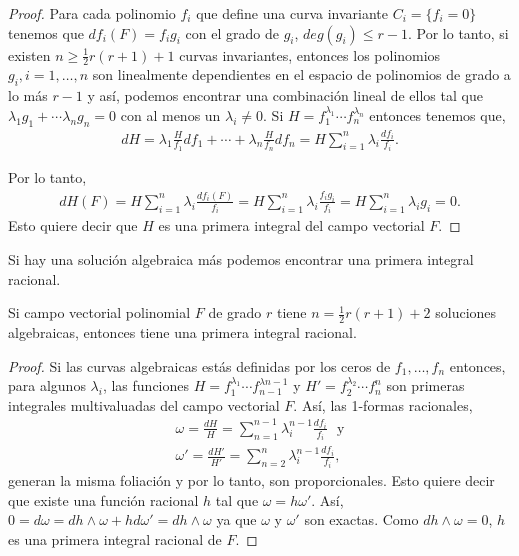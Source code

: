 \begin{proof}
Para cada polinomio $f_{i}$ que define una curva invariante $C_{i}=\{f_{i}=0\}$ tenemos que $df_{i}(F)=f_{i}g_{i}$ con el grado de $g_{i}$, $deg(g_{i})\leq r-1$. Por lo tanto, si existen $n\geq \frac{1}{2}r(r+1)+1$ curvas invariantes, entonces los polinomios $g_{i}, i=1,\ldots,n$ son linealmente dependientes en el espacio de polinomios de grado a lo más $r-1$ y así, podemos encontrar una combinación lineal de ellos tal que $\lambda_{1}g_{1}+\cdots \lambda_{n}g_{n}=0$ con al menos un $\lambda_{i}\neq 0$. Si $H=f_{1}^{\lambda_{1}}\cdots f_{n}^{\lambda_{n}}$ entonces tenemos que,
\begin {align*}
dH=\lambda_{1}\frac{H}{f_{1}}df_{1}+\cdots+\lambda_{n}\frac{H}{f_{n}}df_{n}=H\sum_{i=1}^{n}\lambda_{i}\frac{df_{i}}{f_{i}}.
\end{align*}

\noindent Por lo tanto,
\begin{align*}
dH(F)=H\sum_{i=1}^{n}\lambda_{i}\frac{df_{i}(F)}{f_{i}}=H\sum_{i=1}^{n}\lambda_{i}\frac{f_{i}g_{i}}{f_{i}}=H\sum_{i=1}^{n}\lambda_{i}g_{i}=0.
\end{align*}
Esto quiere decir que $H$ es una primera integral del campo vectorial $F$.
\end{proof}

Si hay una solución algebraica más podemos encontrar una primera integral racional.

\begin{Teorema}
\label{Darboux}
Si campo vectorial polinomial $F$ de grado $r$ tiene $n=\frac{1}{2}r(r+1)+2$ soluciones algebraicas, entonces tiene una primera integral racional.
\end{Teorema}
\begin{proof}
Si las curvas algebraicas estás definidas por los ceros de $f_{1},\ldots,f_{n}$ entonces, para algunos $\lambda_{i}$, las funciones $H=f_{1}^{\lambda_{1}}\cdots f_{n-1}^{\lambda{n-1}}$ y $H'=f_{2}^{\lambda_{2}}\cdots f_{n}^{n}$ son primeras integrales multivaluadas del campo vectorial $F$. Así, las 1-formas racionales,
\begin{align*}
\omega=\frac{dH}{H}=\sum_{n=1}^{n-1}\lambda_{i}^{n-1}\frac{df_{i}}{f_{i}}\,\,\,\, \mathrm{y}\\
\omega'=\frac{dH'}{H'}=\sum_{n=2}^{n}\lambda_{i}^{n-1}\frac{df_{i}}{f_{i}},
\end{align*}
\noindent generan la misma foliación y por lo tanto, son proporcionales. Esto quiere decir que existe una función racional $h$ tal que $\omega =h\omega'$. Así, $0=d\omega=dh\wedge \omega + hd\omega' =dh\wedge\omega$ ya que $\omega$ y $\omega'$ son exactas. Como $dh\wedge\omega =0$, $h$ es una primera integral racional de $F$.
\end{proof}


